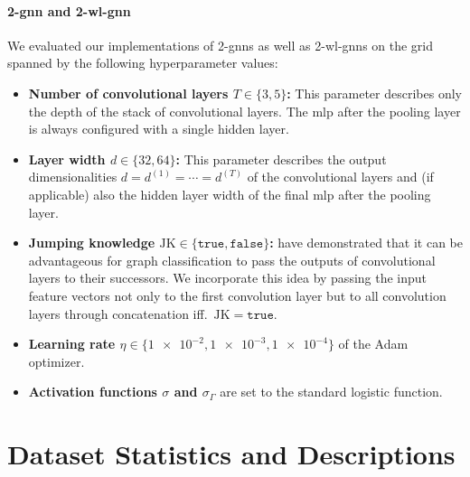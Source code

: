 \paragraph{2-\acs{gnn} and 2-\acs{wl}-\acs{gnn}}
We evaluated our implementations of 2-\acsp{gnn} as well as 2-\acs{wl}-\acsp{gnn} on the grid spanned by the following hyperparameter values:
\begin{itemize}[itemsep=2pt,parsep=2pt]
	\item \textbf{Number of convolutional layers $T \in \{ 3, 5 \}$:}
		This parameter describes only the depth of the stack of convolutional layers.
		The \ac{mlp} after the pooling layer is always configured with a single hidden layer.
	\item \textbf{Layer width $d \in \{ 32, 64 \}$:}
		This parameter describes the output dimensionalities $d = d^{(1)} = \cdots = d^{(T)}$ of the convolutional layers and (if applicable) also the hidden layer width of the final \ac{mlp} after the pooling layer.
	\item \textbf{Jumping knowledge $\mathrm{JK} \in \{ \mathtt{true}, \mathtt{false} \}$:}
		\citet{Xu2018a} have demonstrated that it can be advantageous for graph classification to pass the outputs of convolutional layers to their successors.
		We incorporate this idea by passing the input feature vectors not only to the first convolution layer but to all convolution layers through concatenation iff.\ $\mathrm{JK} = \mathtt{true}$.
	\item \textbf{Learning rate $\eta \in \{ \num{1e-2}, \num{1e-3}, \num{1e-4} \}$} of the Adam optimizer.
	\item \textbf{Activation functions $\sigma$ and $\sigma_{\Gamma}$} are set to the standard logistic function.
\end{itemize}

\section{Dataset Statistics and Descriptions}%
\label{sec:appendix:ds-stats}

